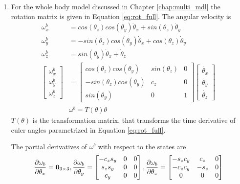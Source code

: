 \begin{enumerate}
\item For the whole body model discussed in Chapter \ref{chap:multi_mdl} the rotation matrix is given in Equation \ref{eq:rot_full}. The angular velocity is
\begin{equation}
	\begin{split}
	\omega_x^b &= cos(\theta_z)cos(\theta_y)\dot{\theta}_x + sin(\theta_z)\dot{\theta}_y \\
	\omega_y^b &= - sin(\theta_z)cos(\theta_y)\dot{\theta}_x + cos(\theta_z)\dot{\theta}_y \\
	\omega_z^b &= sin(\theta_y)\dot{\theta}_x + \dot{\theta}_z \\
	\begin{bmatrix}
	\omega_x^b\\ \omega_y^b\\ \omega_z^b
	\end{bmatrix}
	 &= 
	\begin{bmatrix}
		cos(\theta_z)cos(\theta_y) &sin(\theta_z) &0 \\
	 	-sin(\theta_z)cos(\theta_y) &c_z&0 \\
		sin(\theta_y) &0 &1
	\end{bmatrix}
	\begin{bmatrix}
			\dot{\theta_x} \\ \dot{\theta_y}\\ \dot{\theta_z}
	\end{bmatrix}\\
	& \omega^b = T(\theta) \dot{\theta}
	\end{split}
\end{equation}
$T(\theta)$ is the transformation matrix, that transforms the time derivative of euler angles parametrized in Equation \ref{eq:rot_full}.

The partial derivatives of $\omega^b$ with respect to the states are
$$\frac{\partial {\omega_b}}{\partial {\theta_x}} = \textbf{0}_{3\times 3},\frac{\partial {\omega_b}}{\partial {\theta_y}} = \begin{bmatrix}	-c_zs_y &0 &0\\ s_zs_y &0 &0\\ c_y &0 &0 \end{bmatrix}, \frac{\partial {\omega_b}}{\partial {\theta_z}} = \begin{bmatrix}	-s_zc_y &c_z &0\\ -c_zc_y &-s_z &0\\ 0 &0 &0 \end{bmatrix} $$


\end{enumerate}
